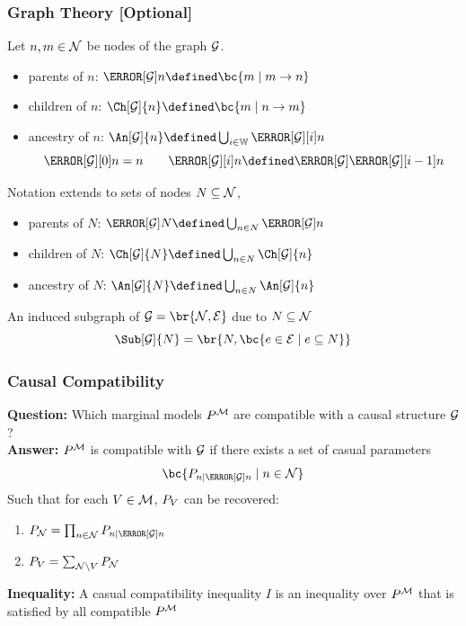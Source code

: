 \documentclass[
    hyperref={bookmarks=false},%
    xcolor={dvipsnames},
]{beamer}
\renewcommand{\term}[1]{\textcolor{Mahogany}{#1}}
\begin{document}
\begin{frame}
    \frametitle{Graph Theory [Optional]}
    Let $n, m \in \mathcal{N}$ be nodes of the graph $\mathcal{G}$.
    \begin{itemize}
        \item \term{parents of $n$}: $\Pa[\graph]{n} \defined \bc{m \mid m \to n}$
        \item \term{children of $n$}: $\Ch[\graph]{n} \defined \bc{m \mid n \to m}$
        \item \term{ancestry of $n$}: $\An[\graph]{n} \defined \bigcup_{i\in\mathbb{W}} \Pa[\graph][i]{n}$
        \[ \Pa[\graph][0]{n} = n \qquad \Pa[\graph][i]{n} \defined \Pa[\graph]{\Pa[\graph][i-1]{n}} \]
    \end{itemize}
    Notation extends to sets of nodes $N \subseteq \mathcal{N}$,
    \begin{itemize}
        \item \term{parents of $N$}: $\Pa[\graph]{N} \defined \bigcup_{n\in N}\Pa[\graph]{n}$
        \item \term{children of $N$}: $\Ch[\graph]{N} \defined \bigcup_{n\in N}\Ch[\graph]{n}$
        \item \term{ancestry of $N$}: $\An[\graph]{N} \defined \bigcup_{n\in N}\An[\graph]{n}$
    \end{itemize}
    An \term{induced subgraph} of $\graph = \br{\nodes, \edges}$ due to $N \subseteq \mathcal{N}$
    \[ \Sub[\graph]{N} = \br{N, \bc{e \in \edges \mid e \subseteq N}} \]
\end{frame}

\begin{frame}
    \frametitle{Causal Compatibility}
    \textbf{Question:} Which marginal models $\prob^{\mscenario}$ are \term{compatible} with a causal structure $\mathcal{G}$?\\
    \textbf{Answer:} $\prob^{\mscenario}$ is compatible with $\mathcal{G}$ if there exists a set of \term{casual parameters}
    \[ \bc{\prob[n \mid \Pa[\graph]{n}] \mid n \in \nodes} \]
    Such that for each $V \in \mathcal{M}$, $\prob[V]$ can be recovered:
    \begin{enumerate}
        \item $\prob[\nodes] = \prod_{n\in\nodes}\prob[n \mid \Pa[\graph]{n}]$
        \item $\prob[V] = \sum_{\nodes \setminus V} \prob[\nodes]$
    \end{enumerate}
    \textbf{Inequality:} A \term{casual compatibility inequality} $I$ is an inequality over $\prob^{\mscenario}$ that is satisfied by all compatible $\prob^{\mscenario}$
\end{frame}
\end{document}
